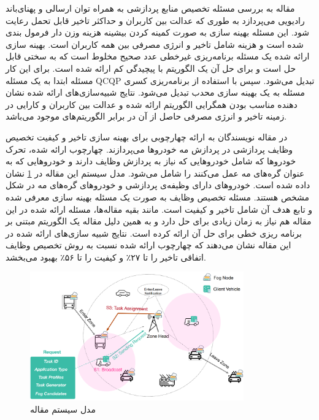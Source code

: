     مقاله \cite{du2018computation} به بررسی مسئله تخصیص منابع پردازشی به همراه توان ارسالی و پهنای‌باند رادیویی می‌پردازد به طوری که عدالت بین کاربران و حداکثر تاخیر قابل تحمل رعایت شود.
    این مسئله بهینه سازی به صورت کمینه کردن بیشینه هزینه وزن دار فرمول بندی شده است و هزینه شامل تاخیر و انرژی مصرفی بین همه کاربران است.
    بهینه سازی ارائه شده یک مسئله برنامه‌ریزی غیرخطی عدد صحیح مخلوط است که به سختی قابل حل است و برای حل آن یک الگوریتم با پیچیدگی کم ارائه شده است.
    برای این کار مسئله ابتدا به یک مسئله QCQP تبدیل می‌شود.
    سپس با استفاده از برنامه‌ریزی کسری مسئله به یک بهینه سازی محدب تبدیل می‌شود.
    نتایج شبیه‌سازی‌های ارائه شده نشان دهنده مناسب بودن همگرایی الگوریتم ارائه شده و عدالت بین کاربران و کارایی در زمینه تاخیر و انرژی مصرفی حاصل از آن در برابر الگوریتم‌های موجود می‌باشد.

    در مقاله \cite{zhu2018folo} نویسندگان به ارائه چهارچوبی برای بهینه سازی تاخیر و کیفیت تخصیص وظایف پردازشی در پردازش مه خودرو‌ها می‌پردازند.
    چهارچوب ارائه شده، تحرک خودرو‌ها که شامل خودرو‌هایی که نیاز به پردازش وظایف دارند و خودرو‌هایی که به عنوان گره‌های مه عمل می‌کنند را شامل می‌شود.
    مدل سیستم این مقاله در \cref{fig:chapter_2:system_model_zhu2018folo} نشان داده شده است.
    خودرو‌های دارای وظیفه‌ی پردازشی و خودرو‌های گره‌های مه در شکل مشخص هستند.
    مسئله تخصیص وظایف به صورت یک مسئله بهینه سازی معرفی شده و تابع هدف آن شامل تاخیر و کیفیت است.
    مانند بقیه مقاله‌ها، مسئله ارائه شده در این مقاله هم نیاز به زمان زیادی برای حل دارد و به همین دلیل مقاله یک الگوریتم مبتنی بر برنامه ریزی خطی برای حل آن ارائه کرده است.
    نتایج شبیه سازی‌های ارائه شده در این مقاله نشان می‌دهند که چهارچوب ارائه شده نسبت به روش تخصیص وظایف اتفاقی تاخیر را تا ۲۷٪ و کیفیت را تا ۵۶٪ بهبود می‌بخشد.

    \begin{figure}[h]
      \centerline{\includegraphics[width=9.2cm]{graphics/chapter_2/system_model_zhu2018folo}}
      \caption{مدل سیستم مقاله \cite{zhu2018folo}}
      \label{fig:chapter_2:system_model_zhu2018folo}
    \end{figure}

